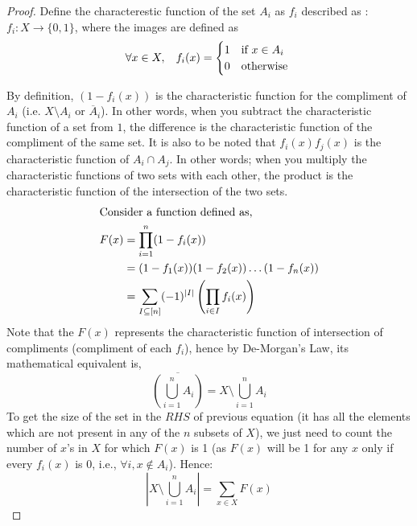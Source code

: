 \begin{proof}
Define the characterestic function of the set $A_i$ as $f_i$ described as : $f_i:X\longrightarrow\{0,1\}$, where the images are defined as $$\forall x \in X,\hspace{0.3cm} f_i(x) = 
  \begin{cases}
    1&\mbox{if } x \in A_i \\
    0& \textrm{otherwise }
  \end{cases}
$$

By definition, $(1-f_i(x))$ is the characteristic function for the compliment of $A_i$ (i.e. $X\setminus A_i$ or $\overline A_i$). In other words, when you subtract the characteristic function of a set from $1$, the difference is the characteristic function of the compliment of the same set. It is also to be noted that $f_i(x)f_j(x)$ is the characteristic function of $A_i\cap A_j$. In other words; when you multiply the characteristic functions of two sets with each other, the product is the characteristic function of the intersection of the two sets. 
\begin{align}
\intertext{Consider a function defined as,} F(x) &= \prod_{i=1}^{n}(1-f_i(x))\nonumber \\
&= (1-f_1(x))(1-f_2(x)) \ldots (1-f_n(x))\nonumber  \\
&= \sum_{I\subseteq[n]}(-1)^{|I|}\left(\prod_{i \in I} f_i(x)\right) \label{eq:F_def_in_PIE}
\end{align}
Note that the $F(x)$ represents the characteristic function of intersection of compliments (compliment of each $f_i$), hence by De-Morgan's Law, its mathematical equivalent is,
\[
\overline{\left(\bigcup_{i=1}^{n} A_i\right)} = X \setminus \bigcup	_{i=1}^{n}A_i
\]
To get the size of the set in the $RHS$ of previous equation (it has all the elements which are not present in any of the $n$ subsets of $X$), we just need to count the number of $x$'s in $X$ for which $F(x)$ is 1 (as $F(x)$ will be 1 for any $x$ only if every $f_i(x)$ is 0, i.e., $\forall i,x \notin A_i$). Hence:
\begin{equation}
\label{eq:sigma_F_1}
|X \setminus \bigcup_{i=1}^{n}A_i| = \sum_{x \in X} F(x) 
\end{equation}


\end{proof}
